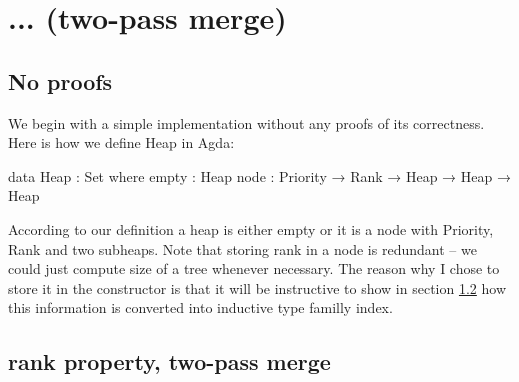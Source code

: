 \section{... (two-pass merge)}



\subsection{No proofs}

We begin with a simple implementation without any proofs of its correctness. Here is how we define Heap in Agda:

\begin{code}
data Heap : Set where
  empty : Heap
  node  : Priority → Rank → Heap → Heap → Heap
\end{code}

According to our definition a heap is either empty or it is a node with Priority, Rank and two subheaps. Note that storing rank in a node is redundant -- we could just compute size of a tree whenever necessary. The reason why I chose to store it in the constructor is that it will be instructive to show in section \ref{sec:rank-property} how this information is converted into inductive type familly index.



\subsection{rank property, two-pass merge}\label{sec:rank-property}